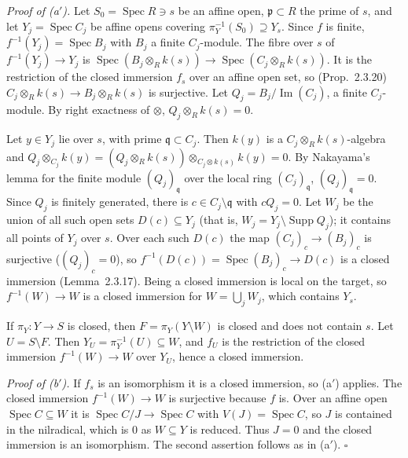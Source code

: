 \documentclass[11pt]{article}
\begin{document}
\emph{Proof of (a$'$).} Let $S_0=\operatorname{Spec}R\ni s$ be an affine open, $\mathfrak p\subset R$ the prime of $s$, and let $Y_j=\operatorname{Spec}C_j$ be affine opens covering $\pi_Y^{-1}(S_0)\supseteq Y_s$. Since $f$ is finite, $f^{-1}(Y_j)=\operatorname{Spec}B_j$ with $B_j$ a finite $C_j$-module. The fibre over $s$ of $f^{-1}(Y_j)\to Y_j$ is $\operatorname{Spec}(B_j\otimes_Rk(s))\to\operatorname{Spec}(C_j\otimes_Rk(s))$. It is the restriction of the closed immersion $f_s$ over an affine open set, so (Prop.~2.3.20) $C_j\otimes_Rk(s)\to B_j\otimes_Rk(s)$ is surjective. Let $Q_j=B_j/\operatorname{Im}(C_j)$, a finite $C_j$-module. By right exactness of $\otimes$, $Q_j\otimes_Rk(s)=0$.

Let $y\in Y_j$ lie over $s$, with prime $\mathfrak q\subset C_j$. Then $k(y)$ is a $C_j\otimes_Rk(s)$-algebra and $Q_j\otimes_{C_j}k(y)=(Q_j\otimes_Rk(s))\otimes_{C_j\otimes k(s)}k(y)=0$. By Nakayama's lemma for the finite module $(Q_j)_{\mathfrak q}$ over the local ring $(C_j)_{\mathfrak q}$, $(Q_j)_{\mathfrak q}=0$. Since $Q_j$ is finitely generated, there is $c\in C_j\setminus\mathfrak q$ with $cQ_j=0$. Let $W_j$ be the union of all such open sets $D(c)\subseteq Y_j$ (that is, $W_j=Y_j\setminus\operatorname{Supp}Q_j$); it contains all points of $Y_j$ over $s$. Over each such $D(c)$ the map $(C_j)_c\to(B_j)_c$ is surjective ($(Q_j)_c=0$), so $f^{-1}(D(c))=\operatorname{Spec}(B_j)_c\to D(c)$ is a closed immersion (Lemma~2.3.17). Being a closed immersion is local on the target, so $f^{-1}(W)\to W$ is a closed immersion for $W=\bigcup_jW_j$, which contains $Y_s$.

If $\pi_Y:Y\to S$ is closed, then $F=\pi_Y(Y\setminus W)$ is closed and does not contain $s$. Let $U=S\setminus F$. Then $Y_U=\pi_Y^{-1}(U)\subseteq W$, and $f_U$ is the restriction of the closed immersion $f^{-1}(W)\to W$ over $Y_U$, hence a closed immersion.

\emph{Proof of (b$'$).} If $f_s$ is an isomorphism it is a closed immersion, so (a$'$) applies. The closed immersion $f^{-1}(W)\to W$ is surjective because $f$ is. Over an affine open $\operatorname{Spec}C\subseteq W$ it is $\operatorname{Spec}C/J\to\operatorname{Spec}C$ with $V(J)=\operatorname{Spec}C$, so $J$ is contained in the nilradical, which is $0$ as $W\subseteq Y$ is reduced. Thus $J=0$ and the closed immersion is an isomorphism. The second assertion follows as in (a$'$). \hfill$\square$
\end{document}
